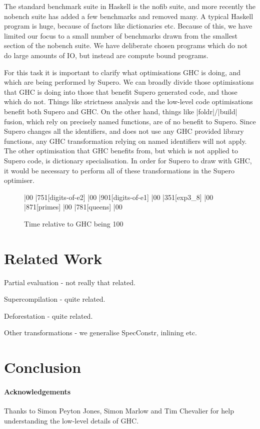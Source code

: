 \documentclass{llncs}
\begin{document}
The standard benchmark suite in Haskell is the nofib suite, and more recently the nobench suite has added a few benchmarks and removed many. A typical Haskell program is huge, because of factors like dictionaries etc. Because of this, we have limited our focus to a small number of benchmarks drawn from the smallest section of the nobench suite. We have deliberate chosen programs which do not do large amounts of IO, but instead are compute bound programs.

For this task it is important to clarify what optimisations GHC is doing, and which are being performed by Supero. We can broadly divide those optimisations that GHC is doing into those that benefit Supero generated code, and those which do not. Things like strictness analysis and the low-level code optimisations benefit both Supero and GHC. On the other hand, things like |foldr|/|build| fusion, which rely on precisely named functions, are of no benefit to Supero. Since Supero changes all the identifiers, and does not use any GHC provided library functions, any GHC transformation relying on named identifiers will not apply. The other optimisation that GHC benefits from, but which is not applied to Supero code, is dictionary specialisation. In order for Supero to draw with GHC, it would be necessary to perform all of these transformations in the Supero optimiser.

\begin{figure}[tb]
\begin{center}
\begin{barenv}
 
\bar{0}{0}
\bar{75}{1}[digits-of-e2]
\bar{0}{0}
\bar{90}{1}[digits-of-e1]
\bar{0}{0}
\bar{35}{1}[exp3\_8]
\bar{0}{0}
\bar{87}{1}[primes]
\bar{0}{0}
\bar{78}{1}[queens]
\bar{0}{0}
\end{barenv}
\end{center}
\caption{Time relative to GHC being 100}
\end{figure}


\section{Related Work}

Partial evaluation - not really that related.

Supercompilation - quite related.

Deforestation - quite related.

Other transformations - we generalise SpecConstr, inlining etc.

\section{Conclusion}

\paragraph{Acknowledgements} Thanks to Simon Peyton Jones, Simon Marlow and Tim Chevalier for help understanding the low-level details of GHC.




\end{document}
